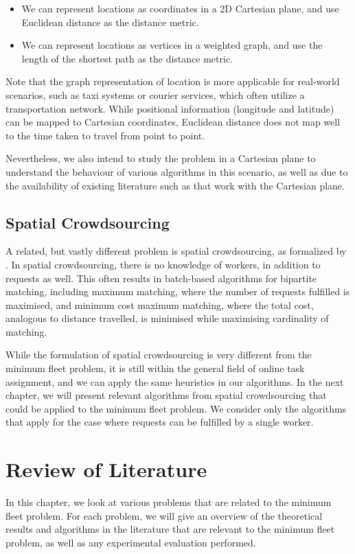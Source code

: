 \documentclass[urop]{socreport}
\begin{document}
\begin{itemize}
    \item We can represent locations as coordinates in a 2D Cartesian plane, and use Euclidean distance as the distance metric.
    \item We can represent locations as vertices in a weighted graph, and use the length of the shortest path as the distance metric.
\end{itemize}

Note that the graph representation of location is more applicable for real-world scenarios, such as taxi systems or courier services, which often utilize a transportation network. While positional information (longitude and latitude) can be mapped to Cartesian coordinates, Euclidean distance does not map well to the time taken to travel from point to point.

Nevertheless, we also intend to study the problem in a Cartesian plane to understand the behaviour of various algorithms in this scenario, as well as due to the availability of existing literature such as \cite{cheng,tong} that work with the Cartesian plane.

\section{Spatial Crowdsourcing}
A related, but vastly different problem is spatial crowdsourcing, as formalized by \cite{spatial}. In spatial crowdsourcing, there is no knowledge of workers, in addition to requests as well. This often results in batch-based algorithms for bipartite matching, including maximum matching, where the number of requests fulfilled is maximised, and minimum cost maximum matching, where the total cost, analogous to distance travelled, is minimised while maximising cardinality of matching. 

While the formulation of spatial crowdsourcing is very different from the minimum fleet problem, it is still within the general field of online task assignment, and we can apply the same heuristics in our algorithms. In the next chapter, we will present relevant algorithms from spatial crowdsourcing that could be applied to the minimum fleet problem. We consider only the algorithms that apply for the case where requests can be fulfilled by a single worker.

\chapter{Review of Literature}
In this chapter, we look at various problems that are related to the minimum fleet problem. For each problem, we will give an overview of the theoretical results and algorithms in the literature that are relevant to the minimum fleet problem, as well as any experimental evaluation performed. 
\end{document}
